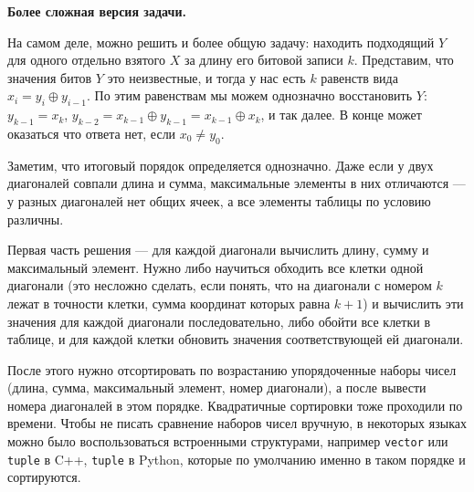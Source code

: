 \documentclass[12pt]{article}
\theoremstyle{definition}
\begin{document}
\textbf{Более сложная версия задачи.}

На самом деле, можно решить и более общую задачу: находить подходящий $Y$ для одного отдельно взятого $X$ за длину его битовой записи $k$. Представим, что значения битов $Y$ это неизвестные, и тогда у нас есть $k$ равенств вида $x_i = y_i \oplus y_{i  - 1}$. По этим равенствам мы можем однозначно восстановить $Y$: $y_{k - 1} = x_k$, $y_{k - 2} = x_{k - 1} \oplus y_{k - 1} = x_{k - 1} \oplus x_k$, и так далее. В конце может оказаться что ответа нет, если $x_0 \ne y_0$.

\pagebreak

Заметим, что итоговый порядок определяется однозначно. Даже если у двух диагоналей совпали длина и сумма, максимальные элементы в них отличаются --- у разных диагоналей нет общих ячеек, а все элементы таблицы по условию различны.

Первая часть решения --- для каждой диагонали вычислить длину, сумму и максимальный элемент. Нужно либо научиться обходить все клетки одной диагонали (это несложно сделать, если понять, что на диагонали с номером $k$ лежат в точности клетки, сумма координат которых равна $k + 1$) и вычислить эти значения для каждой диагонали последовательно, либо обойти все клетки в таблице, и для каждой клетки обновить значения соответствующей ей диагонали.

После этого нужно отсортировать по возрастанию упорядоченные наборы чисел (длина, сумма, максимальный элемент, номер диагонали), а после вывести номера диагоналей в этом порядке. Квадратичные сортировки тоже проходили по времени. Чтобы не писать сравнение наборов чисел вручную, в некоторых языках можно было воспользоваться встроенными структурами, например \verb|vector| или \verb|tuple| в C++, \verb|tuple| в Python, которые по умолчанию именно в таком порядке и сортируются.

\pagebreak

\end{document}
